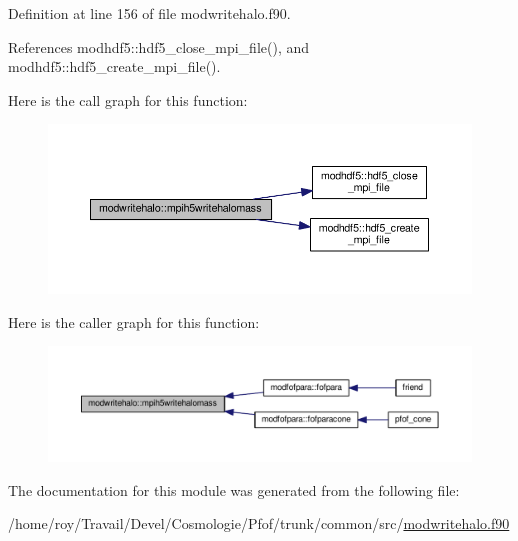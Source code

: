 Definition at line 156 of file modwritehalo.\-f90.



References modhdf5\-::hdf5\-\_\-close\-\_\-mpi\-\_\-file(), and modhdf5\-::hdf5\-\_\-create\-\_\-mpi\-\_\-file().



Here is the call graph for this function\-:\nopagebreak
\begin{figure}[H]
\begin{center}
\leavevmode
\includegraphics[width=350pt]{classmodwritehalo_a89848d0de917714b051873fda01d98d1_cgraph}
\end{center}
\end{figure}




Here is the caller graph for this function\-:\nopagebreak
\begin{figure}[H]
\begin{center}
\leavevmode
\includegraphics[width=350pt]{classmodwritehalo_a89848d0de917714b051873fda01d98d1_icgraph}
\end{center}
\end{figure}




The documentation for this module was generated from the following file\-:\begin{DoxyCompactItemize}
\item 
/home/roy/\-Travail/\-Devel/\-Cosmologie/\-Pfof/trunk/common/src/\hyperlink{modwritehalo_8f90}{modwritehalo.\-f90}\end{DoxyCompactItemize}
